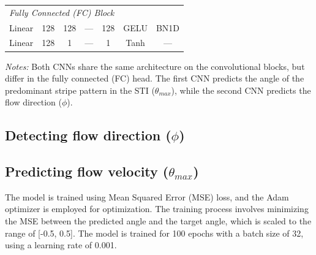 \documentclass[12pt]{elsarticle}
\begin{document}
\begin{table}[!htbp]
{\begin{tabular}{llccccc}
        \midrule
        \multicolumn{6}{l}{\textit{Fully Connected (FC) Block}} \\
        Linear                    & 128                 & 128                 & ---     & 128           & GELU    & BN1D   \\
        Linear                    & 128                 & 1                   & ---     & 1             & Tanh  & ---      \\
        \bottomrule
    \end{tabular}
    } %
    \par\medskip\footnotesize
    \textit{Notes:} Both CNNs share the same architecture on the convolutional blocks, but differ in the fully connected (FC) head. The first CNN predicts the angle of the predominant stripe pattern in the STI ($\theta_{max}$), while the second CNN predicts the flow direction ($\phi$). 
\end{table}

\subsection{Detecting flow direction ($\phi$)}


\subsection{Predicting flow velocity ($\theta_{max}$)}
The model is trained using Mean Squared Error (MSE) loss, and the Adam optimizer is employed for optimization. The training process involves minimizing the MSE between the predicted angle and the target angle, which is scaled to the range of [-0.5, 0.5]. The model is trained for 100 epochs with a batch size of 32, using a learning rate of 0.001.


\newpage

\end{document}
